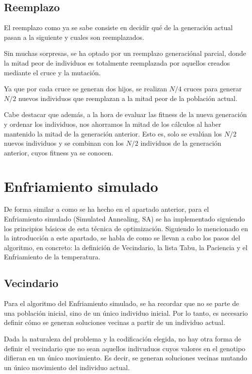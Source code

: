 \documentclass[11pt,spanish,listoffigures,listoftables]{tfgetsinf}
\begin{document}
\subsection{Reemplazo}
El reemplazo como ya se sabe consiste en decidir qué de la generación actual pasan a la siguiente y cuales son reemplazados. 

Sin muchas sorpresas, se ha optado por un reemplazo generaciónal parcial, donde la mitad peor de individuos es totalmente reemplazada por aquellos creados mediante el cruce y la mutación.

Ya que por cada cruce se generan dos hijos, se realizan $N/4$ cruces para generar $N/2$ nuevos individuos que reemplazan a la mitad peor de la población actual. 

Cabe destacar que además, a la hora de evaluar las fitness de la nueva generación y ordenar los individuos, nos ahorramos la mitad de los cálculos al haber mantenido la mitad de la generación anterior. Esto es, solo se evalúan los $N/2$ nuevos individuos y se combinan con los $N/2$ individuos de la generación anterior, cuyos fitness ya se conocen.


\section{Enfriamiento simulado}
De forma similar a como se ha hecho en el apartado anterior, para el Enfriamiento simulado (Simulated Annealing, SA) \cite{} se ha implementado siguiendo los principios básicos de esta técnica de optimización. Siguiendo lo mencionado en la introducción a este apartado, se habla de como se llevan a cabo los pasos del algoritmo, en concreto: la definición de Vecindario, la lista Tabu, la Paciencia y el Enfriamiento de la temperatura.

\subsection{Vecindario}
Para el algoritmo del Enfriamiento simulado, se ha recordar que no se parte de una población inicial, sino de un único individuo inicial. Por lo tanto, es necesario definir cómo se generan soluciones vecinas a partir de un individuo actual. 

Dada la naturaleza del problema y la codificación elegida, no hay otra forma de definir el vecindario que no sean aquellos indivuduos cuyos valores en el genotipo difieran en un único movimiento. Es decir, se generan soluciones vecinas mutando un único movimiento del individuo actual.
\end{document}
